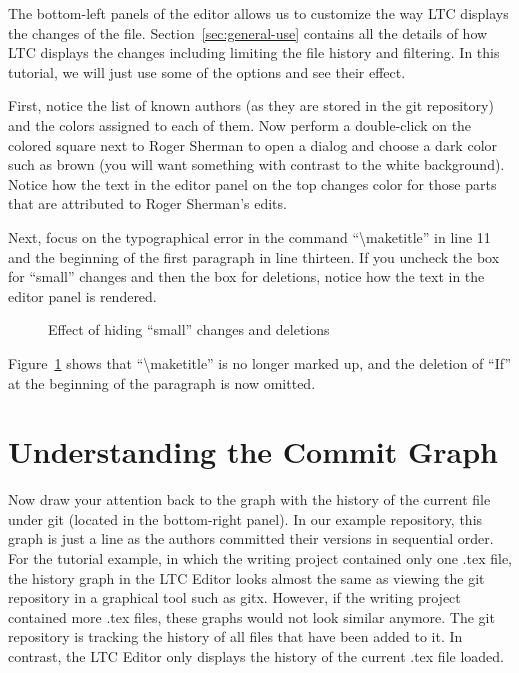 The bottom-left panels of the editor allows us to customize the way LTC displays the changes of the file.  Section~\ref{sec:general-use} contains all the details of how LTC displays the changes including limiting the file history and filtering.  In this tutorial, we will just use some of the options and see their effect.

First, notice the list of known authors (as they are stored in the git repository) and the colors assigned to each of them.  Now perform a double-click on the colored square next to Roger Sherman to open a dialog and  choose a dark color such as brown (you will want something with contrast to the white background).  Notice how the text in the editor panel on the top changes color for those parts that are attributed to Roger Sherman's edits.

Next, focus on the typographical error in the command ``\textbackslash maketitle'' in line 11 and the beginning of the first paragraph in line thirteen.  If you uncheck the box for ``small'' changes and then the box for deletions, notice how the text in the editor panel is rendered.
\begin{figure}[t]
\centering
{}
\hspace{2ex}
\hspace{2ex}
\caption{Effect of hiding ``small'' changes and deletions} \label{fig:editor-filter-small}
\end{figure}
Figure~\ref{fig:editor-filter-small} shows that ``\textbackslash maketitle'' is no longer marked up, and the deletion of ``If'' at the beginning of the paragraph is now omitted.

\section{Understanding the Commit Graph}

Now draw your attention back to the graph with the history of the current file under git (located in the bottom-right panel).  In our example repository, this graph is just a line as the authors committed their versions in sequential order.  For the tutorial example, in which the writing project contained only one .tex file, the history graph in the LTC Editor looks almost the same as viewing the git repository in a graphical tool such as gitx.  However, if the writing project contained more .tex files, these graphs would not look similar anymore.  The git repository is tracking the history of all files that have been added to it.  In contrast, the LTC Editor only displays the history of the current .tex file loaded.

